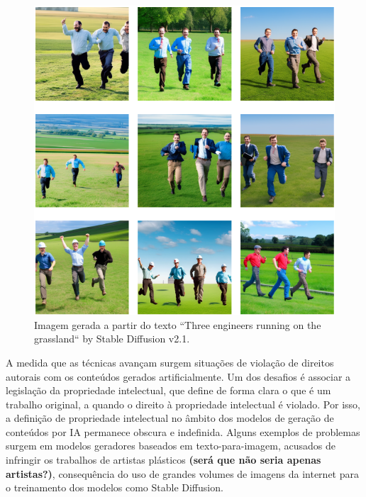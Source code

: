 \begin{figure}
  \centering 
  \includegraphics[scale=0.47]{images_generated_with_text_three_engineers.png}
  \caption{Imagem gerada a partir do texto ``Three engineers running on the grassland``  by Stable Diffusion v2.1.}
  \label{fig:images_of_three_engineers}
\end{figure}



A medida que as técnicas avançam surgem situações de violação de direitos autorais
com os conteúdos gerados artificialmente. Um dos desafios é associar a legislação da propriedade intelectual, 
que define de forma clara o que é um trabalho original, 
a quando o direito à propriedade intelectual é violado. Por isso, a definição de propriedade intelectual no âmbito 
dos modelos de geração de conteúdos por IA permanece obscura e indefinida.
Alguns exemplos de problemas surgem em modelos geradores 
baseados em texto-para-imagem, acusados de infringir os trabalhos de artistas plásticos \textbf{(será que não seria apenas artistas?)}, 
consequência do uso de grandes volumes de imagens da internet para o treinamento dos modelos como Stable Diffusion.




